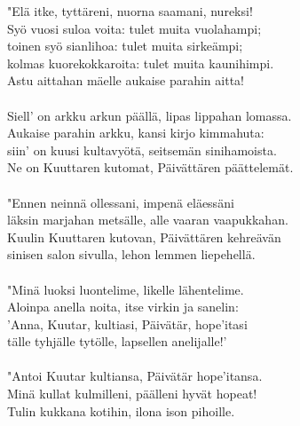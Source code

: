 "Elä itke, tyttäreni, nuorna saamani, nureksi!                 \\
Syö vuosi suloa voita: tulet muita vuolahampi;                 \\
toinen syö sianlihoa: tulet muita sirkeämpi;                   \\
kolmas kuorekokkaroita: tulet muita kaunihimpi.                \\
Astu aittahan mäelle  aukaise parahin aitta!                   \\
                                                               \\
Siell' on arkku arkun päällä, lipas lippahan lomassa.          \\
Aukaise parahin arkku, kansi kirjo kimmahuta:                  \\
siin' on kuusi kultavyötä, seitsemän sinihamoista.             \\
Ne on Kuuttaren kutomat, Päivättären päättelemät.              \\
                                                               \\
"Ennen neinnä ollessani, impenä eläessäni                      \\
läksin marjahan metsälle, alle vaaran vaapukkahan.             \\
Kuulin Kuuttaren kutovan, Päivättären kehreävän                \\
sinisen salon sivulla, lehon lemmen liepehellä.                \\
                                                               \\
"Minä luoksi luontelime, likelle lähentelime.                  \\
Aloinpa anella noita, itse virkin ja sanelin:                  \\
'Anna, Kuutar, kultiasi, Päivätär, hope'itasi                  \\
tälle tyhjälle tytölle, lapsellen anelijalle!'                 \\
                                                               \\
"Antoi Kuutar kultiansa, Päivätär hope'itansa.                 \\
Minä kullat kulmilleni, päälleni hyvät hopeat!                 \\
Tulin kukkana kotihin, ilona ison pihoille.                    \\
                                                               \\

